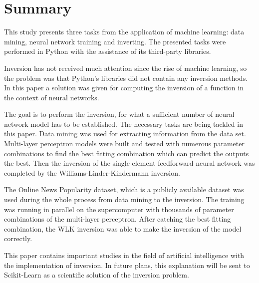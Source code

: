 \chapter{Summary}

This study presents three tasks from the application of machine learning: data mining, neural network training and inverting. The presented tasks were performed in Python with the assistance of its third-party libraries. \medskip

Inversion has not received much attention since the rise of machine learning, so the problem was that Python's libraries did not contain any inversion methods. In this paper a solution was given for computing the inversion of a function in the context of neural networks.\medskip

The goal is to perform the inversion, for what a sufficient number of neural network model has to be established. The necessary tasks are being tackled in this paper. Data mining was used for extracting information from the data set. Multi-layer perceptron models were built and tested with numerous parameter combinations to find the best fitting combination which can predict the outputs the best. Then the inversion of the single element feedforward neural network was completed by the Williams-Linder-Kindermann inversion.\medskip

The Online News Popularity dataset, which is a publicly available dataset was used during the whole process from data mining to the inversion. The training was running in parallel on the supercomputer with thousands of parameter combinations of the multi-layer perceptron. After catching the best fitting combination, the WLK inversion was able to make the inversion of the model correctly. \medskip

This paper contains important studies in the field of artificial intelligence with the implementation of inversion. In future plans, this explanation will be sent to Scikit-Learn as a scientific solution of the inversion problem.